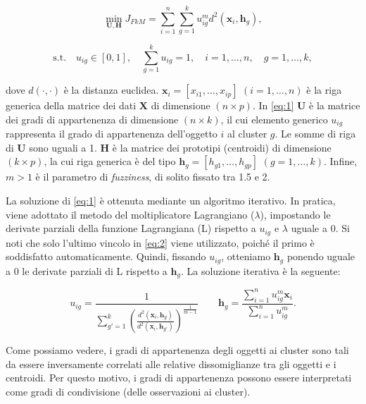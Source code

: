 \documentclass[12pt]{article}
\begin{document}
\begin{equation}
	\min_{\mathbf{U},\mathbf{H}} J_{FkM} = \sum_{i=1}^{n}\sum_{g=1}^{k} u_{ig}^{m}d^{2}(\mathbf{x}_{i},\mathbf{h}_{g}),	
	\label{eq:1}
\end{equation}

\begin{equation}
	\textrm{s.t.} \quad u_{ig} \in [0,1], \quad \sum_{g=1}^{k}u_{ig}=1, \quad  i=1, \dots,n, \quad  g=1, \dots,k,	
	\label{eq:2}
\end{equation}

dove $d(\cdot,\cdot)$ è la distanza euclidea. $\mathbf{x}_{i} = [x_{i1}, \dots, x_{ip}]$ $(i = 1, \dots, n)$ è la riga generica della matrice dei dati $\mathbf{X}$ di dimensione $(n \times p)$. In \eqref{eq:1} $\mathbf{U}$ è la matrice dei gradi di appartenenza di dimensione $(n \times k)$, il cui elemento generico $u_{ig}$ rappresenta il grado di appartenenza dell'oggetto $i$ al cluster $g$. Le somme di riga di $\mathbf{U}$ sono uguali a 1. $\mathbf{H}$ è la matrice dei prototipi (centroidi) di dimensione $(k \times p)$, la cui riga generica è del tipo $\mathbf{h}_{g} = [h_{g1}, \dots, h_{gp}]$ $(g = 1, \dots, k)$. Infine, $m > 1$ è il parametro di \textit{fuzziness}, di solito fissato tra 1.5 e 2.

La soluzione di \eqref{eq:1} è ottenuta mediante un algoritmo iterativo. In pratica, viene adottato il metodo del moltiplicatore Lagrangiano ($\lambda$), impostando le derivate parziali della funzione Lagrangiana (L) rispetto a $u_{ig}$ e $\lambda$ uguale a 0. Si noti che solo l'ultimo vincolo in \eqref{eq:2} viene utilizzato, poiché il primo è soddisfatto automaticamente. Quindi, fissando $u_{ig}$, otteniamo $\mathbf{h}_{g}$ ponendo uguale a 0 le derivate parziali di L rispetto a $\mathbf{h}_{g}$. La soluzione iterativa è la seguente:

\begin{equation}
	u_{ig}=\frac{1}{\sum_{g'=1}^{k}\left(\frac{d^2(\mathbf{x}_i,\mathbf{h}_g)}{d^2(\mathbf{x}_i,\mathbf{h}_{g'})}\right)^{\frac{1}{m-1}}}
	\qquad
	\mathbf{h}_{g}=\frac{\sum_{i=1}^{n} u_{ig}^m\mathbf{x}_{i}}{\sum_{i=1}^{n} u_{ig}^m}.
	\label{eq:3}
\end{equation}

Come possiamo vedere, i gradi di appartenenza degli oggetti ai cluster sono tali da essere inversamente correlati alle relative dissomiglianze tra gli oggetti e i centroidi. Per questo motivo, i gradi di appartenenza possono essere interpretati come gradi di condivisione (delle osservazioni ai cluster).
\end{document}
